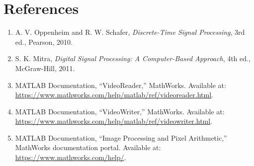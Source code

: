\documentclass[12pt,a4paper,oneside]{report}
\begin{document}
\chapter*{References}
\begin{enumerate}[leftmargin=*]
\item A. V. Oppenheim and R. W. Schafer, \textit{Discrete-Time Signal Processing}, 3rd ed., Pearson, 2010.
\item S. K. Mitra, \textit{Digital Signal Processing: A Computer-Based Approach}, 4th ed., McGraw-Hill, 2011.
\item MATLAB Documentation, “VideoReader,” MathWorks. Available at: \url{https://www.mathworks.com/help/matlab/ref/videoreader.html}.
\item MATLAB Documentation, “VideoWriter,” MathWorks. Available at: \url{https://www.mathworks.com/help/matlab/ref/videowriter.html}.
\item MATLAB Documentation, “Image Processing and Pixel Arithmetic,” MathWorks documentation portal. Available at: \url{https://www.mathworks.com/help/}.
\end{enumerate}

\appendix
\end{document}
